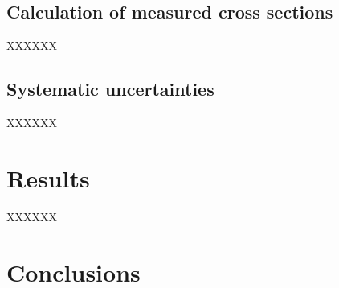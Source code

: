 \documentclass[3p]{elsarticle}
\newcommand{\pp}[1]{\left( #1\right)}
\begin{document}
\subsection{Calculation of measured cross sections}\label{sec:calcs_sec}


XXXXXX

 




 

\subsection{Systematic uncertainties}

XXXXXX




\section{Results}


XXXXXX

          




 
 
 
 \section{Conclusions}
\end{document}
